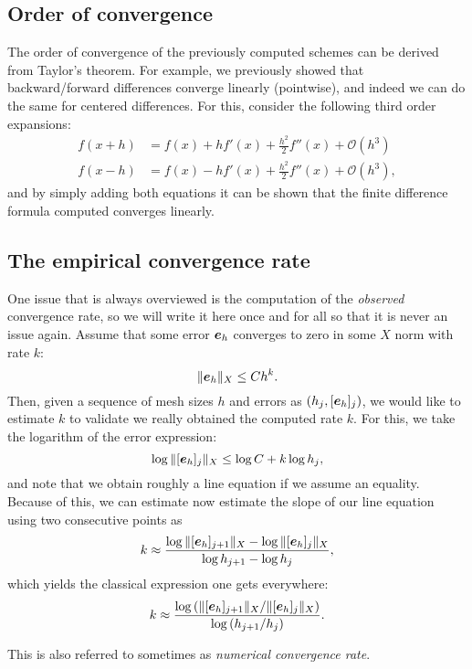 \documentclass{article}
\renewcommand{\vec}{\vectorsym}
\begin{document}
\subsection{Order of convergence}
The order of convergence of the previously computed schemes can be derived from Taylor's theorem. For example, we previously showed that backward/forward differences converge linearly (pointwise), and indeed we can do the same for centered differences. For this, consider the following third order expansions:
    $$
    \begin{aligned}
        f(x+h) &= f(x) + hf'(x) + \frac {h^2} 2 f''(x) + \mathcal O(h^3) \\
        f(x-h) &= f(x) - hf'(x) + \frac {h^2} 2 f''(x) + \mathcal O(h^3),
    \end{aligned}
    $$
and by simply adding both equations it can be shown that the finite difference formula computed converges linearly.
\subsection{The empirical convergence rate}
One issue that is always overviewed is the computation of the \emph{observed} convergence rate, so we will write it here once and for all so that it is never an issue again. Assume that some error $\vec e_h$ converges to zero in some $X$ norm with rate $k$:
    $$ \|\vec e_h\|_X \leq C h^k.$$
    Then, given a sequence of mesh sizes $h$ and errors as $(h_j, [\vec e_h]_j)$, we would like to estimate $k$ to validate we really obtained the computed rate $k$. For this, we take the logarithm of the error expression:
    $$ \log \|[\vec e_h]_j\|_X \leq \log C + k \log h_j, $$
and note that we obtain roughly a line equation if we assume an equality. Because of this, we can estimate now estimate the slope of our line equation using two consecutive points as
$$ k \approx \frac{\log \|[\vec e_h]_{j+1}\|_X - \log \|[\vec e_h]_j\|_X}{ \log h_{j+1} - \log h_j}, $$
which yields the classical expression one gets everywhere: 
    $$ k \approx  \frac{\log \left(\|[\vec e_h]_{j+1}\|_X / \|[\vec e_h]_j\|_X\right)}{ \log \left(h_{j+1} / h_j\right)}. $$

    This is also referred to sometimes as \emph{numerical convergence rate}. 
\end{document}
